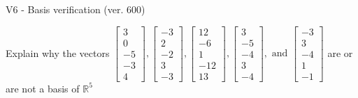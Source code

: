 \begin{exercise}
  \begin{exerciseTitle}V6 - Basis verification (ver. 600)\end{exerciseTitle}
  \begin{exerciseStatement}
    Explain why the vectors \(\left[\begin{array}{r}
3 \\
0 \\
-5 \\
-3 \\
4
\end{array}\right] , \left[\begin{array}{r}
-3 \\
2 \\
-2 \\
3 \\
-3
\end{array}\right] , \left[\begin{array}{r}
12 \\
-6 \\
1 \\
-12 \\
13
\end{array}\right] , \left[\begin{array}{r}
3 \\
-5 \\
-4 \\
3 \\
-4
\end{array}\right] , \text{ and } \left[\begin{array}{r}
-3 \\
3 \\
-4 \\
1 \\
-1
\end{array}\right]\) are or are not a basis of \(\mathbb{R}^5\)	



\end{exerciseStatement}
\end{exercise}
